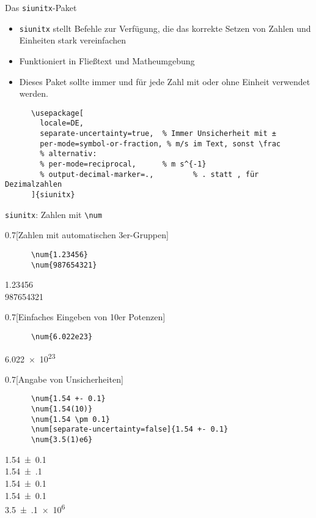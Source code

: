 \begin{frame}[fragile]{
  Das \texttt{siunitx}-Paket
  \hfill
}
\begin{itemize}
    \item \texttt{siunitx} stellt Befehle zur Verfügung, die das korrekte Setzen von Zahlen und Einheiten stark vereinfachen
    \item Funktioniert in Fließtext und Matheumgebung
    \item[$\color{vertexDarkRed}\Rightarrow$] Dieses Paket sollte \alert{immer} und für \alert{jede} Zahl mit oder ohne Einheit verwendet werden.
\end{itemize}
  \begin{Packages}
    \begin{verbatim}
      \usepackage[
        locale=DE,
        separate-uncertainty=true,  % Immer Unsicherheit mit ±
        per-mode=symbol-or-fraction, % m/s im Text, sonst \frac
        % alternativ:
        % per-mode=reciprocal,      % m s^{-1}
        % output-decimal-marker=.,         % . statt , für Dezimalzahlen
      ]{siunitx}
    \end{verbatim}
  \end{Packages}
\end{frame}

\begin{frame}[fragile]{\texttt{siunitx}: Zahlen mit \texttt{\backslash num}}
  \begin{CodeExample}{0.7}[Zahlen mit automatischen 3er-Gruppen]
    \begin{verbatim}
      \num{1.23456}
      \num{987654321}
    \end{verbatim}
  \CodeResult
    \strut
    \num{1.23456} \\
    \num{987654321}
  \end{CodeExample}
  \begin{CodeExample}{0.7}[Einfaches Eingeben von 10er Potenzen]
    \begin{verbatim}
      \num{6.022e23}
    \end{verbatim}
  \CodeResult
    \strut
    \num{6.022e23}
  \end{CodeExample}
  \begin{CodeExample}{0.7}[Angabe von Unsicherheiten]
    \begin{verbatim}
      \num{1.54 +- 0.1}
      \num{1.54(10)}
      \num{1.54 \pm 0.1}
      \num[separate-uncertainty=false]{1.54 +- 0.1}
      \num{3.5(1)e6}
    \end{verbatim}
  \CodeResult
    \strut
    \num{1.54 +- 0.1} \\
    \num{1.54(10)} \\
    \num{1.54 \pm 0.1} \\
    \num[separate-uncertainty=false]{1.54 +- 0.1} \\
    \num{3.5(1)e6}
  \end{CodeExample}
\end{frame}

